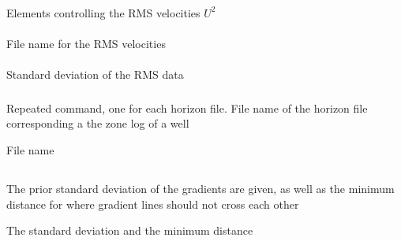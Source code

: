 \subsubsection{}
 \slist
   \item \Description Elements controlling the RMS velocities $U^2$
   \item \Argument 
   \item \Default 
 \elist

\paragraph{}
 \slist
   \item \Description File name for the RMS velocities
   \item \Argument
   \item \Default
 \elist

\paragraph{}
 \slist
   \item \Description Standard deviation of the RMS data
   \item \Argument
   \item \Default
 \elist

\subsubsection{}
 \slist
   \item \Description Repeated command, one for each horizon file. File name of the horizon file corresponding a the zone log of a well
   \item \Argument File name
   \item \Default 
 \elist

\subsection{}
 \slist
   \item \Description The prior standard deviation of the gradients are given, as well as the minimum distance for where gradient lines should not cross each other
   \item \Argument The standard deviation and the minimum distance
   \item \Default
 \elist


